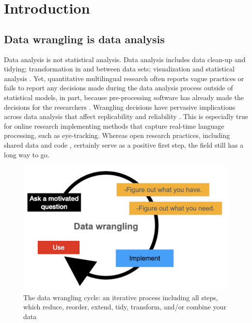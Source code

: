 \section{Introduction}
\subsection{Data wrangling is data analysis}

Data analysis is not statistical analysis. Data analysis includes data clean-up and tidying; transformation in and between data sets; visualization and statistical analysis \parencite{Wickham2017R}. Yet, quantitative multilingual research often reports vague practices or fails to report any decisions made during the data analysis process outside of statistical models, in part, because pre-processing software has already made the decisions for the researchers \parencite{Prystauka_Altmann_Rothman_2023}. Wrangling decisions have pervasive implications across data analysis that affect replicability and reliability \parencite{ana_flex}. This is especially true for online research implementing methods that capture real-time language processing, such as eye-tracking. Whereas open research practices, including shared data and code \parencite{Bolibaugh}, certainly serve as a positive first step, the field still has a long way to go. 

\begin{figure}[h]
    \centering
    \includegraphics[scale=.3]{figures/data_wrangling.png}
    \caption{The data wrangling cycle: an iterative process including all steps, which reduce, reorder, extend, tidy, transform, and/or combine your data}
    \label{fig:data_wrangling}
\end{figure}

